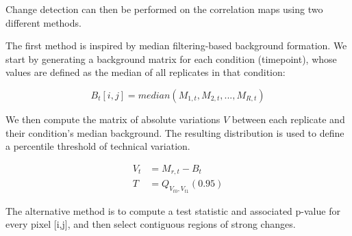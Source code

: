 Change detection can then be performed on the correlation maps using two different methods.

The first method is inspired by median filtering-based background formation. We start by generating a background matrix for each condition (timepoint), whose values are defined as the median of all replicates in that condition: 

\begin{equation}
    B_t[i, j] = median(M_{1, t}, M_{2, t}, ..., M_{R, t})
\end{equation}

We then compute the matrix of absolute variations $V$ between each replicate and their condition's median background. The resulting distribution is used to define a percentile threshold of technical variation.

\begin{align}
    V_t &= M_{r, t} - B_t \\
    T &= Q_{V_{t0},V_{t1}}(0.95)
\end{align}

The alternative method is to compute a test statistic and associated p-value for every pixel [i,j], and then select contiguous regions of strong changes.